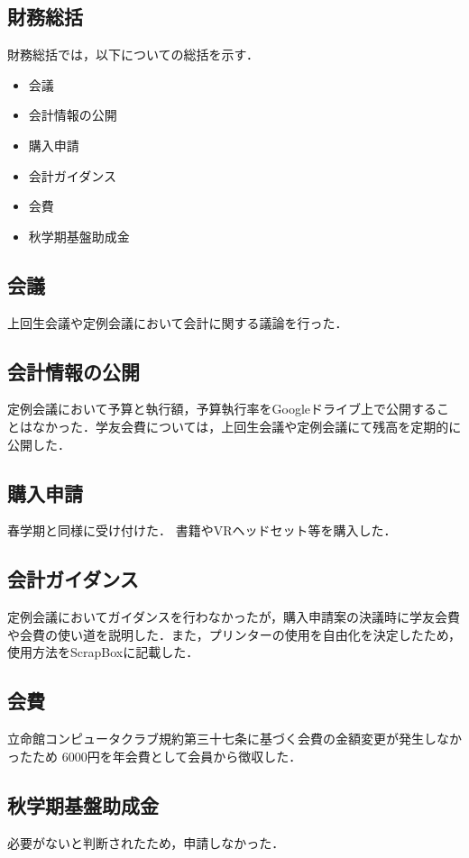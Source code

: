 \subsection*{財務総括}


財務総括では，以下についての総括を示す．
\begin{itemize}
  \item 会議
  \item 会計情報の公開
  \item 購入申請
  \item 会計ガイダンス
  \item 会費
  \item 秋学期基盤助成金
\end{itemize}

\subsection*{会議}
上回生会議や定例会議において会計に関する議論を行った．

\subsection*{会計情報の公開}
定例会議において予算と執行額，予算執行率をGoogleドライブ上で公開することはなかった．学友会費については，上回生会議や定例会議にて残高を定期的に公開した．

\subsection*{購入申請}
春学期と同様に受け付けた．
書籍やVRヘッドセット等を購入した．

\subsection*{会計ガイダンス}
定例会議においてガイダンスを行わなかったが，購入申請案の決議時に学友会費や会費の使い道を説明した．また，プリンターの使用を自由化を決定したため，使用方法をScrapBoxに記載した．

\subsection*{会費}
立命館コンピュータクラブ規約第三十七条に基づく会費の金額変更が発生しなかったため
6000円を年会費として会員から徴収した．

\subsection*{秋学期基盤助成金}
必要がないと判断されたため，申請しなかった．

